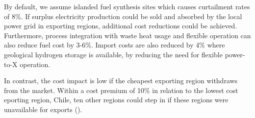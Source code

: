 By default, we assume islanded fuel synthesis sites which causes
curtailment rates of 8\%. If surplus electricity production could be sold and
absorbed by the local power grid in exporting regions, additional cost
reductions could be achieved. Furthermore, process integration with waste heat
usage and flexible operation can also reduce fuel cost by 3-6\%. Import costs
are also reduced by 4\% where geological hydrogen storage is available, by
reducing the need for flexible \mbox{power-to-X} operation.

In contrast, the cost impact is low if the cheapest exporting region withdraws
from the market. Within a cost premium of 10\% in relation to the lowest cost
eporting region, Chile, ten other regions could step in if these regions were
unavailable for exports ().
